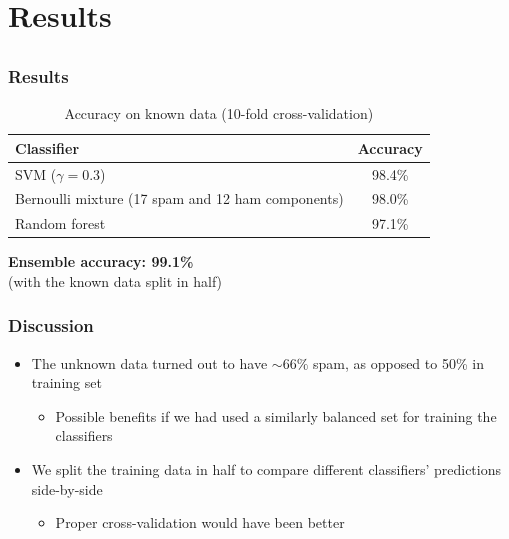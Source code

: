 \documentclass{beamer}
\begin{document}
\section{Results}
\subsection{}
\frame
{
  \frametitle{Results}

{\scriptsize
\begin{table}
\caption{Accuracy on known data (10-fold cross-validation)}
\begin{tabular}{l|c}
Classifier & Accuracy \\ \hline
SVM ($\gamma = 0.3$) & 98.4\% \\
Bernoulli mixture (17 spam and 12 ham components) & 98.0\% \\
Random forest & 97.1\% \\
\end{tabular}
\end{table}
}
\hspace{1.0cm}

{\bf Ensemble accuracy: 99.1\%} \\
(with the known data split in half)
}

\frame
{
    \frametitle{Discussion}
    \begin{itemize}
        \item The unknown data turned out to have $\sim66\%$ spam, as opposed to 50\% in training set
        \begin{itemize}
            \item Possible benefits if we had used a similarly balanced set for training the classifiers
        \end{itemize}
        \item We split the training data in half to compare different classifiers' predictions side-by-side
        \begin{itemize}
            \item Proper cross-validation would have been better
        \end{itemize}
    \end{itemize}
}
\end{document}
